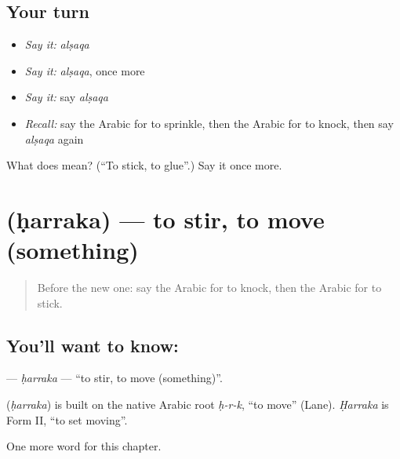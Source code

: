 \subsection*{Your turn}
\begin{itemize}
\raggedright
  \item \emph{Say it:} \emph{alṣaqa}
  \item \emph{Say it:} \emph{alṣaqa}, once more
  \item \emph{Say it:} say \emph{alṣaqa}
  \item \emph{Recall:} say the Arabic for to sprinkle, then the Arabic for to knock, then say \emph{alṣaqa} again
\end{itemize}

\begin{tcolorbox}[breakable,colback=teal!4,colframe=teal!35!black,title={Before you move on}]
What does  mean? (\textquotedblleft{}To stick, to glue\textquotedblright{}.) Say it once more.
\end{tcolorbox}
\section[\texorpdfstring{\ar{حرك} (ḥarraka)}{حرك (ḥarraka)}]{ (ḥarraka) — to stir, to move (something)}

\label{lesson:AR-C260-harraka}



\begin{quote}
Before the new one: say the Arabic for to knock, then the Arabic for to stick.
\end{quote}

\subsection*{You'll want to know: }
\textbf{} — \emph{ḥarraka} — \textquotedblleft{}to stir, to move (something)\textquotedblright{}.

\begin{cousinweb}
\textbf{} (\emph{ḥarraka}) is built on the native Arabic root \emph{ḥ-r-k}, \textquotedblleft{}to move\textquotedblright{} (Lane). \emph{Ḥarraka} is Form II, \textquotedblleft{}to set moving\textquotedblright{}.
\end{cousinweb}

\begin{grammarlens}[title={What you've built}]
One more word for this chapter.
\end{grammarlens}

